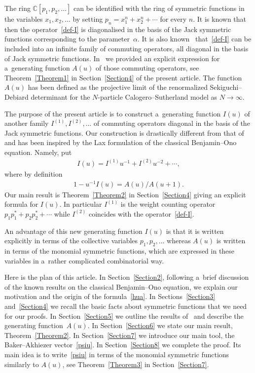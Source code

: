 \documentclass[pdftex]{sigma}
\numberwithin{equation}{section}
\begin{document}
The ring $\mathbb C[p_1,p_2,\ldots]$ can be identif\/ied with the ring of symmetric functions in the
variables $x_1,x_2,\ldots$ by setting $p_n=x_1^{ n}+x_2^{ n}+\cdots$ for
every $n$.
It is known that then the operator~\eqref{def-I} is diagonalised in the basis of the Jack symmetric
functions corresponding to the parameter~$\alpha$.
It is also known~\cite{SV} that~\eqref{def-I} can be included into an inf\/inite family of commuting
operators, all diagonal in the basis of Jack symmetric functions.
In~\cite{NS1} we provided an explicit expression for a~generating function $A(u)$ of those commuting
operators, see Theorem~\ref{Theorem1} in Section~\ref{Section4} of the present article.
The function $A(u)$ has been def\/ined as the projective limit of the renormalized Sekiguchi--Debiard
determinant for the $N$-particle Calogero--Sutherland model as $N\rightarrow\infty$.

The purpose of the present article is to construct a~generating function $I(u)$ of another family
$I^{(1)},I^{(2)},\ldots$ of commuting operators diagonal in the basis of
the Jack symmetric functions.
Our construction is drastically dif\/ferent from that of~\cite{NS1} and has been inspired by the Lax
formulation of the classical Benjamin--Ono equation.
Namely, put
\begin{gather}
\label{iu}
I(u)=I^{(1)}u^{-1}+I^{(2)}u^{-2}+\cdots,
\end{gather}
where by def\/inition
\begin{gather}
\label{hdef}
1-u^{-1}I(u)=A(u)/A(u+1).
\end{gather}
Our main result is Theorem~\ref{Theorem2} in Section~\ref{Section4} giving an explicit formula for $I(u)$.
In particular $I^{(1)}$ is the weight counting operator
$p_1p_1^{\ast}+p_2p_2^{\ast}+\cdots$ while $I^{(2)}$
coincides with the operator~\eqref{def-I}.

An advantage of this new generating function $I(u)$ is that it is written explicitly in terms of the
collective variables $p_1,p_2,\ldots$ whereas $A(u)$ is written in terms of the monomial symmetric
functions, which are expressed in these variables in a~rather complicated combinatorial way.

Here is the plan of this article.
In Section~\ref{Section2}, following a~brief discussion of the known results on the classical Benjamin--Ono
equation, we explain our motivation and the origin of the formula~\eqref{hua}.
In Sections~\ref{Section3} and~\ref{Section4} we recall the basic facts
about symmetric functions that we need for our proofs.
In Section~\ref{Section5} we outline the results of~\cite{NS1} and describe the generating function~$A(u)$.
In Section~\ref{Section6} we state our main result, Theorem~\ref{Theorem2}.
In Section~\ref{Section7} we introduce our main tool, the Baker--Akhiezer vector~\eqref{psiu}.
In Section~\ref{Section8} we complete the proof.
Its main idea is to write~\eqref{psiu} in terms of the monomial symmetric functions similarly to $A(u)$,
see Theorem~\ref{Theorem3} in Section~\ref{Section7}.
\end{document}
